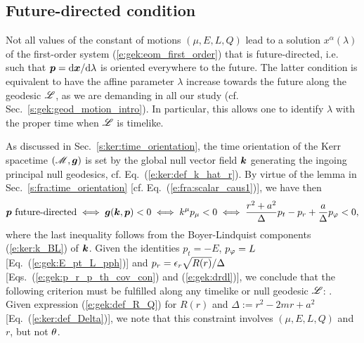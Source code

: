 \subsection{Future-directed condition}

Not all values of the constant of motions $(\mu,E,L,Q)$ lead to a solution
$x^\alpha(\lambda)$ of the first-order system (\ref{e:gek:eom_first_order})
that is future-directed, i.e. such that $\bm{p} = \mathrm{d} \bm{x}/\mathrm{d}\lambda$
is oriented everywhere to the future.
The latter condition is equivalent to have the affine parameter $\lambda$ increase
towards the future along the geodesic $\mathscr{L}$, as we are demanding in all
our study (cf. Sec.~\ref{s:gek:geod_motion_intro}).
In particular, this allows one to identify $\lambda$ with the proper
time when $\mathscr{L}$ is timelike.


As discussed in Sec.~\ref{s:ker:time_orientation}, the time orientation of
the Kerr spacetime $(\mathscr{M},\bm{g})$ is set by the global null
vector field $\bm{k}$ generating the ingoing principal null geodesics, cf. Eq.~(\ref{e:ker:def_k_hat_r}). By virtue of the lemma in Sec.~\ref{s:fra:time_orientation}
[cf. Eq.~(\ref{e:fra:scalar_caus1})], we have then
\[
    \bm{p} \ \mbox{future-directed} \iff \bm{g}(\bm{k},\bm{p}) < 0
    \iff k^\mu p_\mu < 0
    \iff \frac{r^2 + a^2}{\Delta} p_t - p_r + \frac{a}{\Delta} p_\varphi < 0 ,
\]
where the last inequality follows from the Boyer-Lindquist components
(\ref{e:ker:k_BL}) of $\bm{k}$.
Given the identities $p_t = -E$, $p_\varphi = L$
[Eq.~(\ref{e:gek:E_pt_L_pph})] and $p_r = \epsilon_r \sqrt{R(r)}/ \Delta $
[Eqs.~(\ref{e:gek:p_r_p_th_cov_con})
and (\ref{e:gek:drdl})], we conclude that the following criterion must
be fulfilled along any timelike or null geodesic $\mathscr{L}$:
\be \label{e:gek:future_directed}
 .
\ee
Given expression (\ref{e:gek:def_R_Q}) for $R(r)$ and
$\Delta := r^2 - 2m r + a^2$ [Eq.~(\ref{e:ker:def_Delta})],
we note that this constraint involves $(\mu,E,L,Q)$ and $r$, but not $\theta$.

